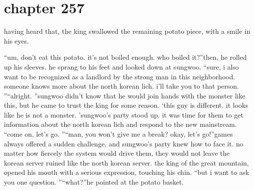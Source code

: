 \section{chapter 257}

                            having heard that, the king swallowed the remaining potato piece, with a smile in his eyes.





“um, don’t eat this potato.
 it’s not boiled enough.
 who boiled it?”then, he rolled up his sleeves.
 he sprang to his feet and looked down at sungwoo.
“sure, i also want to be recognized as a landlord by the strong man in this neighborhood.
 someone knows more about the north korean lich.
 i’ll take you to that person.
”“alright.
”sungwoo didn’t know that he would join hands with the monster like this, but he came to trust the king for some reason.
‘this guy is different.
 it looks like he is not a monster.
’sungwoo’s party stood up.
 it was time for them to get information about the north korean lich and respond to the new mainstream.
“come on, let’s go.
”“man, you won’t give me a break? okay, let’s go!”games always offered a sudden challenge, and sungwoo’s party knew how to face it.
no matter how fiercely the system would drive them, they would not leave the korean server ruined like the north korean server.
the king of the great mountain, opened his mouth with a serious expression, touching his chin.
“but i want to ask you one question.
”“what?”he pointed at the potato basket.

